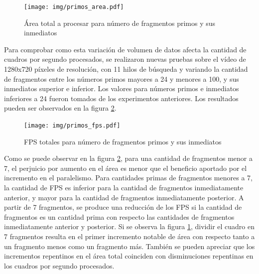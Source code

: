 \begin{figure}[h]

	\texttt{[image: img/primos\_area.pdf]}
	\caption{Área total a procesar para número de fragmentos primos y sus inmediatos}
	\label{primosArea}

\end{figure}

Para comprobar como esta variación de volumen de datos afecta la cantidad de
cuadros por segundo procesados, se realizaron nuevas pruebas sobre el vídeo de
1280x720 píxeles de resolución, con 11 hilos de búsqueda y variando la cantidad
de fragmentos entre los números primos mayores a 24 y menores a 100, y sus
inmediatos superior e inferior. Los valores para números primos e inmediatos
inferiores a 24 fueron tomados de los experimentos anteriores. Los resultados
pueden ser observados en la figura \ref{primosFPS}.

\begin{figure}[h]

	\texttt{[image: img/primos\_fps.pdf]}
	\caption{FPS totales para número de fragmentos primos y sus inmediatos}
	\label{primosFPS}

\end{figure}

Como se puede observar en la figura \ref{primosFPS}, para una cantidad de
fragmentos menor a 7, el perjuicio por aumento en el área es menor que el
beneficio aportado por el incremento en el paralelismo. Para cantidades primas
de fragmentos menores a 7, la cantidad de FPS es inferior para la cantidad de
fragmentos inmediatamente anterior, y mayor para la cantidad de fragmentos
inmediatamente posterior. A partir de 7 fragmentos, se produce una reducción de
los FPS si la cantidad de fragmentos es un cantidad prima con respecto las
cantidades de fragmentos inmediatamente anterior y posterior. Si se observa la
figura \ref{primosArea}, dividir el cuadro en 7 fragmentos resulta en el primer
incremento notable de área con respecto tanto a un fragmento menos como un
fragmento más. También se pueden apreciar que los incrementos repentinos en el
área total coinciden con disminuciones repentinas en los cuadros por segundo
procesados.

